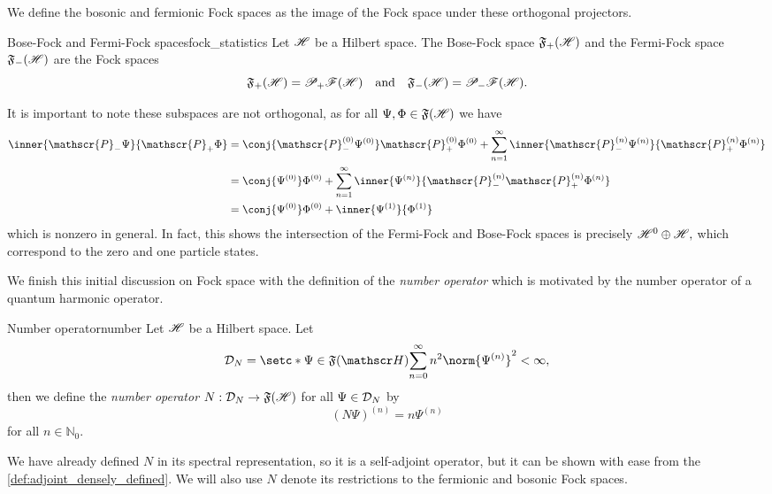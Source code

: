 We define the bosonic and fermionic Fock spaces as the image of the Fock space under these orthogonal projectors.
\begin{definition}{Bose-Fock and Fermi-Fock spaces}{fock_statistics}
    Let \(\mathscr{H}\) be a Hilbert space. The Bose-Fock space \(\mathfrak{F}_+(\mathscr{H})\) and the Fermi-Fock space \(\mathfrak{F}_-(\mathscr{H})\) are the Fock spaces
    \begin{equation*}
        \mathfrak{F}_+(\mathscr{H}) = \mathscr{P}_+\mathscr{F}(\mathscr{H})
        \quad\text{and}\quad
        \mathfrak{F}_-(\mathscr{H}) = \mathscr{P}_-\mathscr{F}(\mathscr{H}).
    \end{equation*}
\end{definition}
It is important to note these subspaces are not orthogonal, as for all \(\Psi, \Phi \in \mathfrak{F}(\mathscr{H})\) we have
\begin{align*}
    \inner{\mathscr{P}_-\Psi}{\mathscr{P}_+\Phi} &= \conj{\mathscr{P}_-^{(0)} \Psi^{(0)}} \mathscr{P}_+^{(0)} \Phi^{(0)} + \sum_{n = 1}^\infty{\inner{\mathscr{P}_-^{(n)} \Psi^{(n)}}{\mathscr{P}_+^{(n)} \Phi^{(n)}}}\\
                                                 &= \conj{\Psi^{(0)}} \Phi^{(0)} + \sum_{n = 1}^\infty{\inner{\Psi^{(n)}}{\mathscr{P}_-^{(n)}\mathscr{P}_+^{(n)}\Phi^{(n)}}}\\
                                                 &= \conj{\Psi^{(0)}}\Phi^{(0)} + \inner{\Psi^{(1)}}{\Phi^{(1)}}
\end{align*}
which is nonzero in general. In fact, this shows the intersection of the Fermi-Fock and Bose-Fock spaces is precisely \(\mathscr{H}^0 \oplus \mathscr{H},\) which correspond to the zero and one particle states.

We finish this initial discussion on Fock space with the definition of the \emph{number operator} which is motivated by the number operator of a quantum harmonic operator.
\begin{definition}{Number operator}{number}
    Let \(\mathscr{H}\) be a Hilbert space. Let 
    \begin{equation*}
        \domain{N} = \setc*{\Psi \in \mathfrak{F}(\hilbert)}{\sum_{n = 0}^\infty{n^2\norm{\Psi^{(n)}}^2} < \infty},
    \end{equation*}
    then we define the \emph{number operator} \(N : \mathcal{D}_{N} \to \mathfrak{F}(\mathscr{H})\) for all \(\Psi \in \mathcal{D}_{N}\) by 
    \begin{equation*}
        \left(N \Psi\right)^{(n)} = n \Psi^{(n)}
    \end{equation*}
    for all \(n \in \mathbb{N}_0\).
\end{definition}
We have already defined \(N\) in its spectral representation, so it is a self-adjoint operator, but it can be shown with ease from the \cref{def:adjoint_densely_defined}. We will also use \(N\) denote its restrictions to the fermionic and bosonic Fock spaces.
